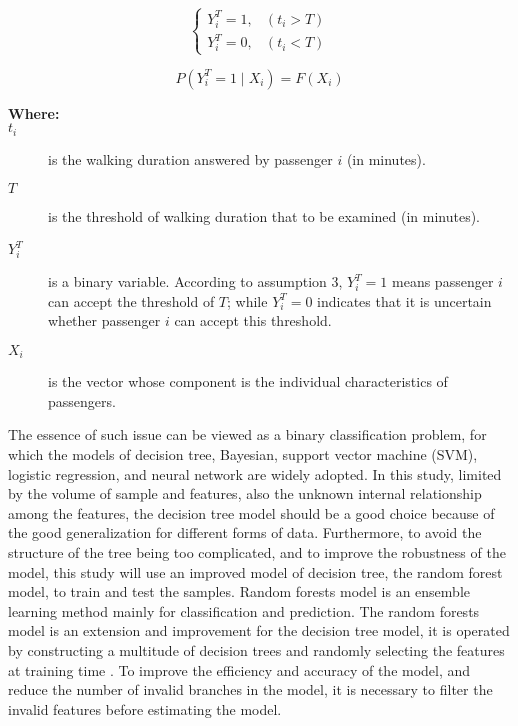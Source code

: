 \begin{equation}
    \left\{\begin{matrix}
		Y^T_i=1,&(t_i>T) \\
		Y^T_i=0,&(t_i<T)
	\end{matrix}\right.
	\label{eq:chp4:threshold}
\end{equation}

\begin{equation}
	P(Y^T_i=1 \mid X_i)=F(X_i)
	\label{eq:chp4:probability}
\end{equation}

%
\begin{description}
	\item[\textbf{Where:}]
	\item[$t_i$] is the walking duration answered by passenger $i$ (in minutes).
	\item[$T$] is the threshold of walking duration that to be examined (in minutes).
	\item[$Y^T_i$] is a binary variable. According to assumption 3, $Y^T_i=1$ means passenger $i$ can accept the threshold of $T$; while $Y^T_i=0$ indicates that it is uncertain whether passenger $i$ can accept this threshold.
	\item[$X_i$] is the vector whose component is the individual characteristics of passengers.
\end{description}

%
The essence of such issue can be viewed as a binary classification problem, for which the models of decision tree, Bayesian, support vector machine (SVM), logistic regression, and neural network are widely adopted. In this study, limited by the volume of sample and features, also the unknown internal relationship among the features, the decision tree model should be a good choice because of the good generalization for different forms of data. Furthermore, to avoid the structure of the tree being too complicated, and to improve the robustness of the model, this study will use an improved model of decision tree, the random forest model, to train and test the samples. Random forests model is an ensemble learning method mainly for classification and prediction. The random forests model is an extension and improvement for the decision tree model, it is operated by constructing a multitude of decision trees and randomly selecting the features at training time \cite{ho1995random,ho1998random}. To improve the efficiency and accuracy of the model, and reduce the number of invalid branches in the model, it is necessary to filter the invalid features before estimating the model.

